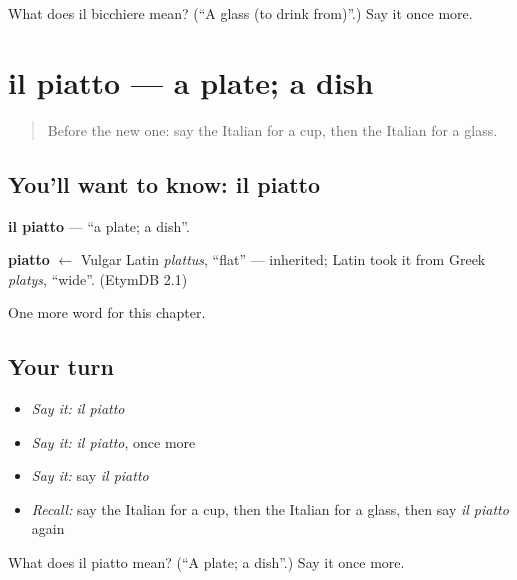 \begin{tcolorbox}[breakable,colback=teal!4,colframe=teal!35!black,title={Before you move on}]
What does il bicchiere mean? (\textquotedblleft{}A glass (to drink from)\textquotedblright{}.) Say it once more.
\end{tcolorbox}
\section[il piatto]{il piatto — a plate; a dish}

\label{lesson:IT-C59-piatto}



\begin{quote}
Before the new one: say the Italian for a cup, then the Italian for a glass.
\end{quote}

\subsection*{You'll want to know: il piatto}
\textbf{il piatto} — \textquotedblleft{}a plate; a dish\textquotedblright{}.

\begin{cousinweb}
\textbf{piatto} $\leftarrow$ Vulgar Latin \emph{plattus}, \textquotedblleft{}flat\textquotedblright{} — inherited; Latin took it from Greek \emph{platys}, \textquotedblleft{}wide\textquotedblright{}. (EtymDB 2.1)
\end{cousinweb}

\begin{grammarlens}[title={What you've built}]
One more word for this chapter.
\end{grammarlens}

\subsection*{Your turn}
\begin{itemize}
\raggedright
  \item \emph{Say it:} \emph{il piatto}
  \item \emph{Say it:} \emph{il piatto}, once more
  \item \emph{Say it:} say \emph{il piatto}
  \item \emph{Recall:} say the Italian for a cup, then the Italian for a glass, then say \emph{il piatto} again
\end{itemize}

\begin{tcolorbox}[breakable,colback=teal!4,colframe=teal!35!black,title={Before you move on}]
What does il piatto mean? (\textquotedblleft{}A plate; a dish\textquotedblright{}.) Say it once more.
\end{tcolorbox}
